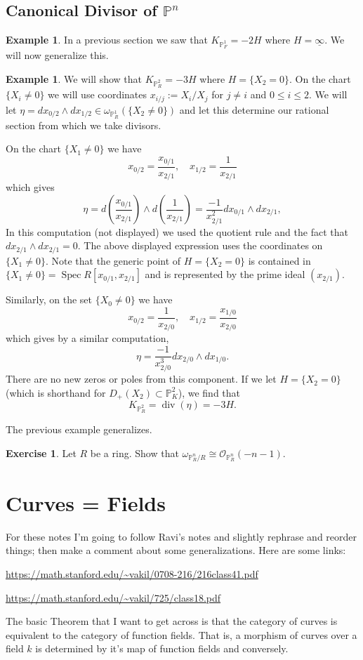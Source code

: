 \documentclass[12pt]{article}
\numberwithin{equation}{section}
\theoremstyle{definition}
\newtheorem{example}[theorem]{Example}
\newtheorem{exercise}[theorem]{Exercise}
\theoremstyle{remark}
\newcommand{\Ocal}{\mathcal{O}}
\newcommand{\PP}{\mathbb{P}}
\newcommand{\Spec}{\operatorname{Spec}}
\renewcommand{\div}{\operatorname{div}}
\begin{document}
\subsection{Canonical Divisor of $\PP^n$}
\begin{example}
In a previous section we saw that $K_{\PP^1_F} = -2H$ where $H = \underline{\infty}$.
We will now generalize this.
\end{example}

\begin{example}
	We will show that $K_{\PP^2_R}= -3H$ where $H = \lbrace X_2 =0 \rbrace$. 
	On the chart $\lbrace X_i \neq 0 \rbrace$ we will use coordinates $x_{i/j}:=X_i/X_j$ for $j\neq i$ and $0\leq i \leq 2$. 
	We will let $\eta = dx_{0/2} \wedge dx_{1/2}\in \omega_{\PP^1_R}(\lbrace X_2 \neq 0 \rbrace)$ and let this determine our rational section from which we take divisors.
	
	On the chart $\lbrace X_1 \neq 0 \rbrace$ we have 
	$$x_{0/2} = \dfrac{x_{0/1}}{x_{2/1}}, \quad x_{1/2}=\dfrac{1}{x_{2/1}}$$ 
	which gives 
	$$ \eta = d\left(\frac{x_{0/1}}{x_{2/1}}\right) \wedge d \left( \frac{1}{x_{2/1}} \right)=\frac{-1}{x_{2/1}^2} dx_{0/1}\wedge dx_{2/1},$$
	In this computation (not displayed) we used the quotient rule and the fact that $dx_{2/1}\wedge dx_{2/1}=0$.
	The above displayed expression uses the coordinates on $\lbrace X_1\neq 0 \rbrace$. 
	Note that the generic point of $H = \lbrace X_2=0\rbrace$ is contained in $\lbrace X_1 \neq 0 \rbrace = \Spec R[x_{0/1},x_{2/1}]$ and is represented by the prime ideal $(x_{2/1})$. 
	
	Similarly, on the set $\lbrace X_0 \neq 0 \rbrace$ we have 
	$$x_{0/2} = \dfrac{1}{x_{2/0}}, \quad x_{1/2} = \dfrac{x_{1/0}}{x_{2/0}}$$ which gives by a similar computation,
	$$\eta  = \frac{-1}{x_{2/0}^3} dx_{2/0}\wedge dx_{1/0}. $$
	There are no new zeros or poles from this component.
	If we let $H = \lbrace X_2=0 \rbrace$ (which is shorthand for $D_+(X_2) \subset \PP^2_K$), we find that 
	 $$K_{\PP^2_R} =\div(\eta) = -3H.$$
\end{example}

The previous example generalizes. 
\begin{exercise}
	Let $R$ be a ring. 
	Show that $\omega_{\PP^n_R/R} \cong \Ocal_{\PP^n_R}(-n-1)$.
\end{exercise}

\section{Curves = Fields}
For these notes I'm going to follow Ravi's notes and slightly rephrase and reorder things; then make a comment about some generalizations.
Here are some links:
\begin{center}
	\url{https://math.stanford.edu/~vakil/0708-216/216class41.pdf}
\end{center}
\begin{center}
	\url{https://math.stanford.edu/~vakil/725/class18.pdf}
\end{center}
The basic Theorem that I want to get across is that the category of curves is equivalent to the category of function fields. 
That is, a morphism of curves over a field $k$ is determined by it's map of function fields and conversely. 
\end{document}
